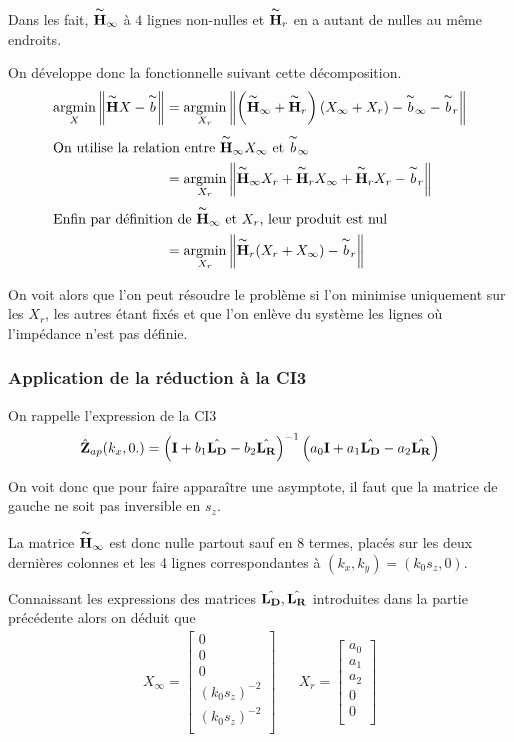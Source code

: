 Dans les fait, \(\overset{\thicksim}{\mathbf{H}}_\infty\) à \(4\) lignes non-nulles et \(\overset{\thicksim}{\mathbf{H}}_r\) en a autant de nulles au même endroits.


On développe donc la fonctionnelle suivant cette décomposition.
\begin{align*}
{\underset{X}{\operatorname{argmin}}}\left\rVert \overset{\thicksim}{\mathbf{H}} X - \overset{\thicksim}{b} \right \rVert &= {\underset{X_r}{\operatorname{argmin}}}\left\rVert \left(\overset{\thicksim}{\mathbf{H}}_\infty + \overset{\thicksim}{\mathbf{H}}_r\right)\left( X_\infty + X_r \right) - \overset{\thicksim}{b}_\infty - \overset{\thicksim}{b}_r \right \rVert
\\
\intertext{On utilise la relation entre \(\overset{\thicksim}{\mathbf{H}}_\infty X_\infty\) et \(\overset{\thicksim}{b}_\infty\)}
&=  {\underset{X_r}{\operatorname{argmin}}}\left\rVert \overset{\thicksim}{\mathbf{H}}_\infty X_r + \overset{\thicksim}{\mathbf{H}}_r X_\infty + \overset{\thicksim}{\mathbf{H}}_r X_r - \overset{\thicksim}{b}_r \right \rVert
\\
\intertext{Enfin par définition de \(\overset{\thicksim}{\mathbf{H}}_\infty\) et \(X_r\), leur produit est nul}
&= {\underset{X_r}{\operatorname{argmin}}} \left\rVert \overset{\thicksim}{\mathbf{H}}_r ( X_r + X_\infty)- \overset{\thicksim}{b}_r \right \rVert
\end{align*}

On voit alors que l'on peut résoudre le problème si l'on minimise uniquement sur les \(X_r\), les autres étant fixés et que l'on enlève du système les lignes où l'impédance n'est pas définie.

\subsubsection{Application de la réduction à la CI3}

On rappelle l'expression de la CI3
\begin{equation}
  \hat{\mathbf{Z}}_{ap}(k_x,0.) = \left(\mathbf{I} + b_1 \hat{\mathbf{L_D}} - b_2 \hat{\mathbf{L_R}} \right)^{-1}\left(a_0\mathbf{I} + a_1 \hat{\mathbf{L_D}} - a_2 \hat{\mathbf{L_R}} \right)
\end{equation}

On voit donc que pour faire apparaître une asymptote, il faut que la matrice de gauche ne soit pas inversible en \(s_z\).

La matrice \(\overset{\thicksim}{\mathbf{H}}_\infty\) est donc nulle partout sauf en 8 termes, placés sur les deux dernières colonnes et les 4 lignes correspondantes à \((k_x,k_y)=(k_0 s_z,0)\).

Connaissant les expressions des matrices \(\hat{\mathbf{L_D}},\hat{\mathbf{L_R}}\) introduites dans la partie précédente alors on déduit que
\begin{align}
  X_\infty = \begin{bmatrix}
    0\\
    0\\
    0\\
    (k_0 s_z)^{-2}\\
    (k_0 s_z)^{-2}\\
  \end{bmatrix}
  & &
  X_r = \begin{bmatrix}
  a_0\\
  a_1\\
  a_2\\
  0\\
  0\\
  \end{bmatrix}
\end{align}

